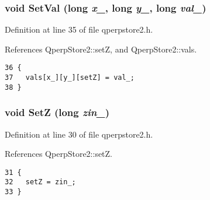 \subsubsection{\setlength{\rightskip}{0pt plus 5cm}void SetVal (long {\em x\_\-}, long {\em y\_\-}, long {\em val\_\-})}\label{qperpstore2_8h_b553105dc5e4c85d03275fed3d74b8d5}




Definition at line 35 of file qperpstore2.h.

References QperpStore2::setZ, and QperpStore2::vals.

\begin{Code}\begin{verbatim}36 {
37   vals[x_][y_][setZ] = val_;
38 }
\end{verbatim}
\end{Code}


\subsubsection{\setlength{\rightskip}{0pt plus 5cm}void SetZ (long {\em zin\_\-})}\label{qperpstore2_8h_369d36f2cf516db573e5620b3cbe3a3c}




Definition at line 30 of file qperpstore2.h.

References QperpStore2::setZ.

\begin{Code}\begin{verbatim}31 {
32   setZ = zin_;
33 }
\end{verbatim}
\end{Code}


